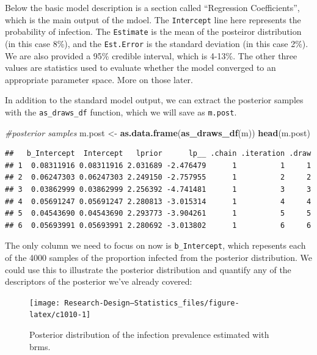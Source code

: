 \documentclass[
]{book}
\newenvironment{Shaded}{\begin{snugshade}}{\end{snugshade}}
\newcommand{\CommentTok}[1]{\textcolor[rgb]{0.56,0.35,0.01}{\textit{#1}}}
\newcommand{\FunctionTok}[1]{\textcolor[rgb]{0.13,0.29,0.53}{\textbf{#1}}}
\newcommand{\NormalTok}[1]{#1}
\newcommand{\OtherTok}[1]{\textcolor[rgb]{0.56,0.35,0.01}{#1}}
\begin{document}
Below the basic model description is a section called ``Regression Coefficients'', which is the main output of the mdoel. The \texttt{Intercept} line here represents the probability of infection. The \texttt{Estimate} is the mean of the posteiror distribution (in this case 8\%), and the \texttt{Est.Error} is the standard deviation (in this case 2\%). We are also provided a 95\% credible interval, which is 4-13\%. The other three values are statistics used to evaluate whether the model converged to an appropriate parameter space. More on those later.

In addition to the standard model output, we can extract the posterior samples with the \texttt{as\_draws\_df} function, which we will save as \texttt{m.post}.

\begin{Shaded}
\begin{Highlighting}[]
\CommentTok{\#posterior samples}
\NormalTok{m.post }\OtherTok{\textless{}{-}} \FunctionTok{as.data.frame}\NormalTok{(}\FunctionTok{as\_draws\_df}\NormalTok{(m))}
\FunctionTok{head}\NormalTok{(m.post)}
\end{Highlighting}
\end{Shaded}

\begin{verbatim}
##   b_Intercept  Intercept   lprior      lp__ .chain .iteration .draw
## 1  0.08311916 0.08311916 2.031689 -2.476479      1          1     1
## 2  0.06247303 0.06247303 2.249150 -2.757955      1          2     2
## 3  0.03862999 0.03862999 2.256392 -4.741481      1          3     3
## 4  0.05691247 0.05691247 2.280813 -3.015314      1          4     4
## 5  0.04543690 0.04543690 2.293773 -3.904261      1          5     5
## 6  0.05693991 0.05693991 2.280692 -3.013802      1          6     6
\end{verbatim}

The only column we need to focus on now is \texttt{b\_Intercept}, which repesents each of the 4000 samples of the proportion infected from the posterior distribution. We could use this to illustrate the posterior distribution and quantify any of the descriptors of the posterior we've already covered:

\begin{figure}

{\centering \texttt{[image: Research-Design---Statistics\_files/figure-latex/c1010-1]} 

}

\caption{Posterior distribution of the infection prevalence estimated with brms.}\label{fig:c1010}
\end{figure}
\end{document}

